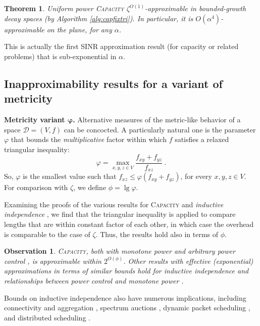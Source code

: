 \documentclass[11pt]{amsart}
\newcounter{foo}
\newtheorem{theorem}[foo]{Theorem}
\newtheorem{observation}[lemma]{Observation}
\def\calD{{\mathcal{D}}}
\newcommand{\prob}[1]{\textsc{#1}}
\newcommand{\Capacity}{\prob{Capacity}}
\newcommand{\capacity}{\Capacity}
\newcommand{\mypara}[1]{\smallskip\noindent\textbf{#1.}}  \newcommand{\tightpara}[1]{\noindent\textbf{#1.}}  \newcommand{\inddim}{D}
\begin{document}
\begin{theorem}
  Uniform power {\capacity} $\zeta^{O(1)}$-approximable in
  bounded-growth decay spaces (by Algorithm \ref{alg:capfixtri}).
  In particular, it is $O(\alpha^4)$-approximable on the plane, for any $\alpha$.
\label{thm:cap-poly-bndgwth}
\end{theorem}

This is actually the first SINR approximation result (for capacity or related problems) that is sub-exponential in $\alpha$.

\subsection{Inapproximability results for a variant of metricity}
\label{sec:expon-phi}

\mypara{Metricity variant  $\boldsymbol{\varphi}$} 
Alternative measures of the metric-like behavior of a space
$\calD=(V,f)$ can
be concocted. A particularly natural one is the 
parameter $\varphi$ that bounds the \emph{multiplicative} factor within which 
$f$ satisfies a relaxed triangular inequality:
\[ \varphi = \max_{x,y,z \in V} \frac{f_{xy} + f_{yz}}{f_{xz}}\ . \]
So, $\varphi$ is the smallest value such that $f_{xz}\le
\varphi(f_{xy}+f_{yz})$, for every $x,y,z\in V$.
For comparison with $\zeta$, we define $\phi = \lg \varphi$.

Examining the proofs of the various results for {\capacity} 
and \emph{inductive independence} \cite{hoeferspaa}, we find that the triangular
inequality is applied to compare lengths that are within constant
factor of each other, in which case the overhead is comparable to the case of $\zeta$. Thus, the results hold also in terms of $\phi$.

\begin{observation} {\capacity}, both with monotone power
  \cite{SODA11,us:ICDCS14} and arbitrary power control
  \cite{KesselheimSODA11}, is approximable within $2^{O(\phi)}$.
  Other results with effective (exponential) approximations in terms
  of similar bounds hold for inductive independence
  \cite{hoeferspaa,us:SODA13} and relationships between power control
  and monotone power \cite{us:SODA13}.
\end{observation}

Bounds on inductive independence also have numerous implications,
including connectivity and aggregation \cite{SODA12,PODC12}, spectrum
auctions \cite{hoeferspaa,HoeferK12}, dynamic packet scheduling
\cite{sirocco12,kesselheimStability}, and distributed scheduling
\cite{KV10,icalp11}.
\end{document}
